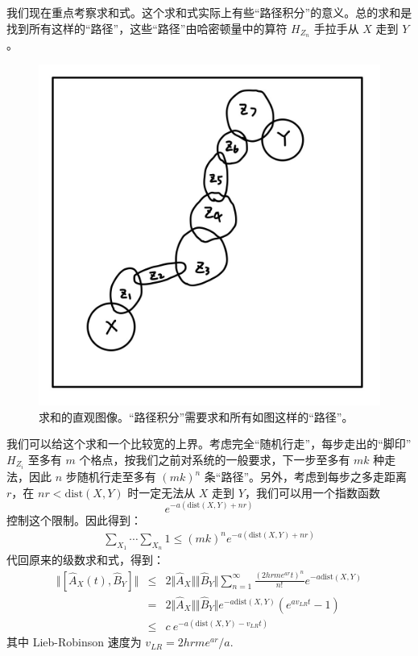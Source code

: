 \documentclass[10pt,UTF8]{ctexart}
\begin{document}
我们现在重点考察求和式。这个求和式实际上有些“路径积分”的意义。总的求和是找到所有这样的“路径”，这些“路径”由哈密顿量中的算符 $H_{Z_n}$ 手拉手从 $X$ 走到 $Y$。
\begin{figure}[H]
\begin{centering}
\includegraphics[width=.4\linewidth]{include/p2}
\par\end{centering}
\caption{求和的直观图像。“路径积分”需要求和所有如图这样的“路径”。}
\end{figure}
\noindent
我们可以给这个求和一个比较宽的上界。考虑完全“随机行走”，每步走出的“脚印” $H_{Z_i}$ 至多有 $m$ 个格点，按我们之前对系统的一般要求，下一步至多有 $mk$ 种走法，因此 $n$ 步随机行走至多有 $(mk)^n$ 条“路径”。另外，考虑到每步之多走距离 $r$，在 $nr < \mathrm{dist}(X,Y)$ 时一定无法从 $X$ 走到 $Y$，我们可以用一个指数函数
\begin{equation}
	e^{-a(\mathrm{dist}(X,Y)+ nr)}
\end{equation}
控制这个限制。因此得到：
\begin{eqnarray}
	\sum_{X_1} \cdots \sum_{X_n} 1
	\le (mk)^n e^{-a(\mathrm{dist}(X,Y)+ nr)}
\end{eqnarray}
代回原来的级数求和式，得到：
\begin{eqnarray}
	\Vert [\hat{A}_X(t), \hat B_Y] \Vert 
	&\le & 2\Vert \hat{A}_X \Vert \Vert\hat{B}_Y\Vert \sum_{n=1}^{\infty} \frac{(2hrme^{ar}t)^n}{n!} e^{-a\mathrm{dist}(X,Y)} \nonumber \\
	&=& 2\Vert \hat{A}_X \Vert \Vert\hat{B}_Y\Vert e^{-a\mathrm{dist}(X,Y)} (e^{av_{LR}t}-1) \\
	&\le & c\ e^{-a(\mathrm{dist}(X,Y)-v_{LR}t)}
\end{eqnarray}
其中 Lieb-Robinson 速度为 $v_{LR} = 2hrme^{ar}/a$.
\end{document}

